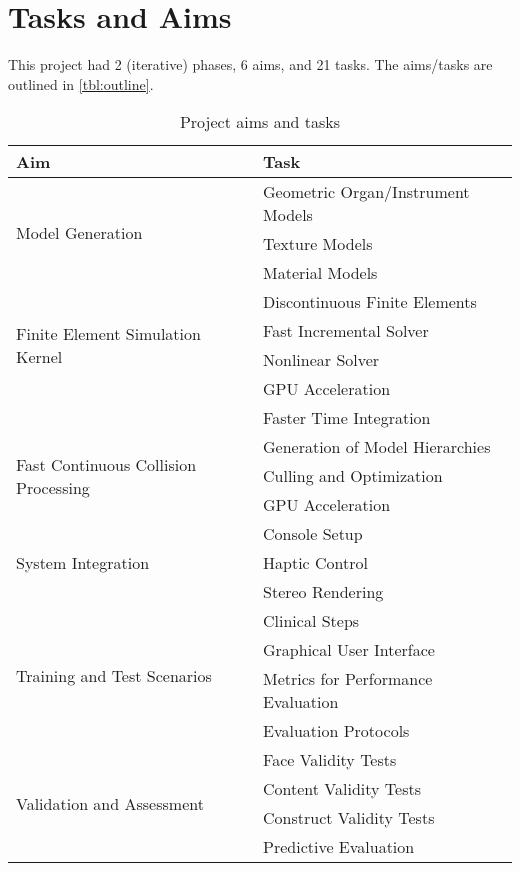 \section{Tasks and Aims}
\label{sec:aims}

This project had 2 (iterative) phases, 6 aims, and 21 tasks. The aims/tasks are outlined in \autoref{tbl:outline}.

\begin{table}
\centering
\begin{tabular}{ll}
  \textbf{Aim} & \textbf{Task}\\
  \toprule
  \multirow[t]{3}{*}{Model Generation}
  & Geometric Organ/Instrument Models\\
  & Texture Models\\
  & Material Models\\
  \midrule
  \multirow[t]{4}{*}{Finite Element Simulation Kernel}
  & Discontinuous Finite Elements\\
  & Fast Incremental Solver\\
  & Nonlinear Solver\\
  & GPU Acceleration\\
  & Faster Time Integration\\
  \midrule
  \multirow[t]{3}{*}{Fast Continuous Collision Processing}
  & Generation of Model Hierarchies\\
  & Culling and Optimization\\
  & GPU Acceleration\\
  \midrule
  \multirow[t]{3}{*}{System Integration}
  & Console Setup\\
  & Haptic Control\\
  & Stereo Rendering\\
  \midrule
  \multirow[t]{4}{*}{Training and Test Scenarios}
  & Clinical Steps\\
  & Graphical User Interface\\
  & Metrics for Performance Evaluation\\
  & Evaluation Protocols\\
  \midrule
  \multirow[t]{4}{*}{Validation and Assessment}
  & Face Validity Tests\\
  & Content Validity Tests\\
  & Construct Validity Tests\\
  & Predictive Evaluation\\
  \bottomrule
\end{tabular}
\caption{Project aims and tasks}
\label{tbl:outline}
\end{table}

